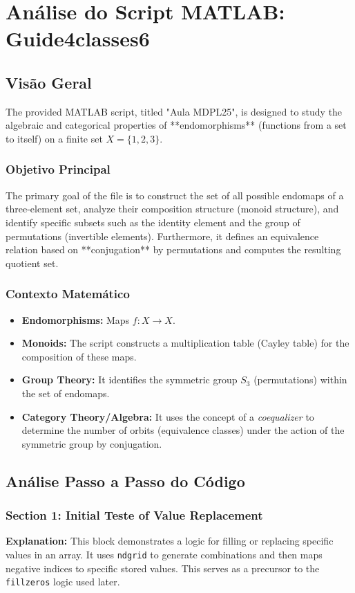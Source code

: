 \chapter{Análise do Script MATLAB: Guide4classes6}

\section{Visão Geral}
The provided MATLAB script, titled "Aula MDPL25", is designed to study the algebraic and categorical properties of **endomorphisms** (functions from a set to itself) on a finite set $X = \{1, 2, 3\}$. 

\subsection{Objetivo Principal}
The primary goal of the file is to construct the set of all possible endomaps of a three-element set, analyze their composition structure (monoid structure), and identify specific subsets such as the identity element and the group of permutations (invertible elements). Furthermore, it defines an equivalence relation based on **conjugation** by permutations and computes the resulting quotient set.

\subsection{Contexto Matemático}
\begin{itemize}
    \item \textbf{Endomorphisms:} Maps $f: X \to X$.
    \item \textbf{Monoids:} The script constructs a multiplication table (Cayley table) for the composition of these maps.
    \item \textbf{Group Theory:} It identifies the symmetric group $S_3$ (permutations) within the set of endomaps.
    \item \textbf{Category Theory/Algebra:} It uses the concept of a \textit{coequalizer} to determine the number of orbits (equivalence classes) under the action of the symmetric group by conjugation.
\end{itemize}

\section{Análise Passo a Passo do Código}

\subsection{Section 1: Initial Teste of Value Replacement}
\textbf{Explanation:} This block demonstrates a logic for filling or replacing specific values in an array. It uses \texttt{ndgrid} to generate combinations and then maps negative indices to specific stored values. This serves as a precursor to the \texttt{fillzeros} logic used later.

